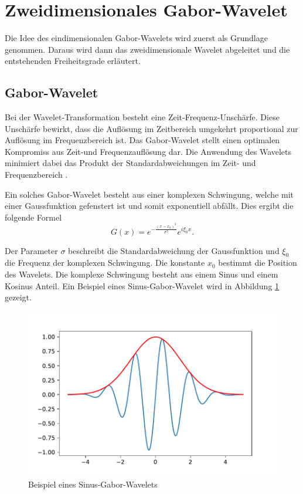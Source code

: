 \section{Zweidimensionales Gabor-Wavelet}

Die Idee des eindimensionalen Gabor-Wavelets wird zuerst als Grundlage genommen. 
Daraus wird dann das zweidimensionale Wavelet abgeleitet und die entstehenden Freiheitsgrade erläutert.

\subsection{Gabor-Wavelet}

Bei der Wavelet-Transformation besteht eine Zeit-Frequenz-Unschärfe.
Diese Unschärfe bewirkt, dass die Auflösung im Zeitbereich umgekehrt proportional zur Auflösung im Frequenzbereich ist.
Das Gabor-Wavelet stellt einen optimalen Kompromiss aus Zeit-und Frequenzauflösung dar.
Die Anwendung des Wavelets minimiert dabei das Produkt der Standardabweichungen im Zeit- und Frequenzbereich \cite{paper:communication}.

Ein solches Gabor-Wavelet besteht aus einer komplexen Schwingung, welche mit einer Gaussfunktion gefenstert ist und somit exponentiell abfällt.
Dies ergibt die folgende Formel
\begin{equation}\label{eq:1d_gabor}
G(x)= e^{-\frac{(x-x_{0})^{2}}{\sigma^{2}}} e^{i\xi_{0}x}.
\end{equation}

Der Parameter $\sigma$ beschreibt die Standardabweichung der Gaussfunktion und $\xi_{0}$ die Frequenz der komplexen Schwingung. 
Die konstante $x_0$ bestimmt die Position des Wavelets.
Die komplexe Schwingung besteht aus einem Sinus und einem  Kosinus Anteil. 
Ein Beispiel eines Sinus-Gabor-Wavelet wird in Abbildung \ref{fig:gabor1d} gezeigt.

\begin{figure}
	\centering
	\includegraphics[width=0.7\linewidth]{./papers/visuell/images/gabor_1d}
	\caption{Beispiel eines Sinus-Gabor-Wavelets}
	\label{fig:gabor1d}
\end{figure}


